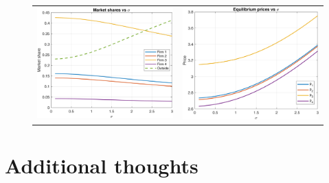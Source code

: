 \documentclass[12pt]{article}
\theoremstyle{plain}
\theoremstyle{plain}
\begin{document}
\begin{figure}[H]
\caption{}
 \label{fig:2}
\centering{}%
\begin{tabular}{cc}
\includegraphics[scale=0.6]{figures/simulations/shares_vs_sigma.png} & \includegraphics[scale=0.6]{figures/simulations/prices_vs_sigma.png}
\end{tabular}
\end{figure}
\newpage
 

\section{Additional thoughts}
\end{document}
